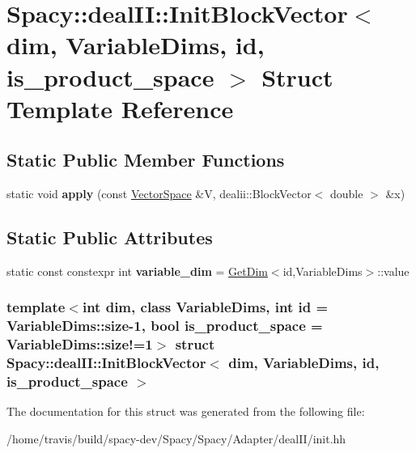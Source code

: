 \hypertarget{structSpacy_1_1dealII_1_1InitBlockVector}{\section{\-Spacy\-:\-:deal\-I\-I\-:\-:\-Init\-Block\-Vector$<$ dim, \-Variable\-Dims, id, is\-\_\-product\-\_\-space $>$ \-Struct \-Template \-Reference}
\label{structSpacy_1_1dealII_1_1InitBlockVector}
}
\subsection*{\-Static \-Public \-Member \-Functions}
\begin{DoxyCompactItemize}
\item 
\hypertarget{structSpacy_1_1dealII_1_1InitBlockVector_a5bdd74274de8f6acd518b478f194cc74}{static void {\bfseries apply} (const \hyperlink{classSpacy_1_1VectorSpace}{\-Vector\-Space} \&\-V, dealii\-::\-Block\-Vector$<$ double $>$ \&x)}\label{structSpacy_1_1dealII_1_1InitBlockVector_a5bdd74274de8f6acd518b478f194cc74}

\end{DoxyCompactItemize}
\subsection*{\-Static \-Public \-Attributes}
\begin{DoxyCompactItemize}
\item 
\hypertarget{structSpacy_1_1dealII_1_1InitBlockVector_a966530a726e2f865fecbb7cc53c43b5e}{static const constexpr int {\bfseries variable\-\_\-dim} = \hyperlink{structSpacy_1_1dealII_1_1GetDim}{\-Get\-Dim}$<$id,\-Variable\-Dims$>$\-::value}\label{structSpacy_1_1dealII_1_1InitBlockVector_a966530a726e2f865fecbb7cc53c43b5e}

\end{DoxyCompactItemize}
\subsubsection*{template$<$int dim, class Variable\-Dims, int id = \-Variable\-Dims\-::size-\/1, bool is\-\_\-product\-\_\-space = \-Variable\-Dims\-::size!=1$>$ struct Spacy\-::deal\-I\-I\-::\-Init\-Block\-Vector$<$ dim, Variable\-Dims, id, is\-\_\-product\-\_\-space $>$}



\-The documentation for this struct was generated from the following file\-:\begin{DoxyCompactItemize}
\item 
/home/travis/build/spacy-\/dev/\-Spacy/\-Spacy/\-Adapter/deal\-I\-I/init.\-hh\end{DoxyCompactItemize}
